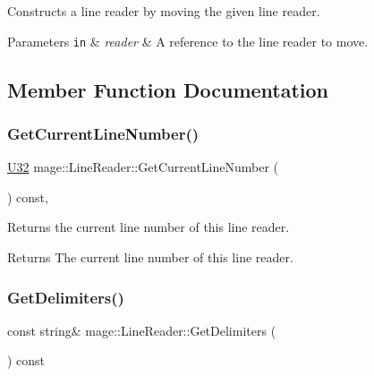 Constructs a line reader by moving the given line reader.


\begin{DoxyParams}[1]{Parameters}
\mbox{\tt in}  & {\em reader} & A reference to the line reader to move. \\
\hline
\end{DoxyParams}


\subsection{Member Function Documentation}
\hypertarget{classmage_1_1_line_reader_aa0ed768e2799b74f2341c56fc6ac4969}{}\label{classmage_1_1_line_reader_aa0ed768e2799b74f2341c56fc6ac4969} 
\subsubsection{\texorpdfstring{Get\+Current\+Line\+Number()}{GetCurrentLineNumber()}}
{\footnotesize\ttfamily \hyperlink{namespacemage_a41c104c036fba3756a74e19f793eeaa1}{U32} mage\+::\+Line\+Reader\+::\+Get\+Current\+Line\+Number (\begin{DoxyParamCaption}{ }\end{DoxyParamCaption}) const\hspace{0.3cm}{\ttfamily [protected]}, {\ttfamily [noexcept]}}

Returns the current line number of this line reader.

\begin{DoxyReturn}{Returns}
The current line number of this line reader. 
\end{DoxyReturn}
\hypertarget{classmage_1_1_line_reader_aa00e1e27b614e11ec9f70e52d0bac551}{}\label{classmage_1_1_line_reader_aa00e1e27b614e11ec9f70e52d0bac551} 
\subsubsection{\texorpdfstring{Get\+Delimiters()}{GetDelimiters()}}
{\footnotesize\ttfamily const string\& mage\+::\+Line\+Reader\+::\+Get\+Delimiters (\begin{DoxyParamCaption}{ }\end{DoxyParamCaption}) const\hspace{0.3cm}{\ttfamily [noexcept]}}

